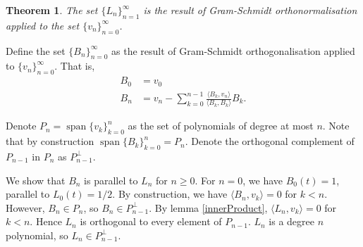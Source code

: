 \documentclass[10pt]{article}
\newtheorem{theorem}{Theorem}
\newenvironment{proof}[1][Proof]{\begin{trivlist}
\item[\hskip \labelsep {\bfseries #1}]}{\end{trivlist}}
\newcommand{\Span}{\operatorname{span}}
\begin{document}
        \begin{theorem}
            The set $\{L_n\}_{n=1}^\infty$ is the result of Gram-Schmidt orthonormalisation
            applied to the set $\{v_n\}_{n=0}^\infty$. 
        \end{theorem}
        \begin{proof}
            Define the set $\{B_n\}_{n=0}^\infty$ as the result of Gram-Schmidt orthogonalisation
            applied to $\{v_n\}_{n=0}^\infty$. That is,
            \begin{align*}
                B_0 &= v_0\\
                B_n &= v_n-\sum_{k=0}^{n-1} \frac{\langle B_k,v_n\rangle}{\langle B_k,B_k\rangle} B_k.
            \end{align*}
  
            Denote $P_n = \Span\{v_k\}_{k=0}^n$ as the set of
            polynomials of degree at most $n$. Note that by construction $\Span\{B_k\}_{k=0}^n = P_n$.
            Denote the orthogonal complement of $P_{n-1}$ in $P_{n}$ as $P_{n-1}^\perp$.
            
            We show that $B_n$ is parallel to $L_n$ for $n\geq 0$. For $n = 0$, we
            have $B_0(t) = 1$, parallel to $L_0(t) = 1/2$. By construction, we have $\langle B_n,v_k\rangle = 0$ for $k < n$.
            However, $B_n \in P_n$, so $B_n \in P_{n-1}^\perp$. 
            By lemma \ref{innerProduct}, $\langle L_n,v_k\rangle = 0$ for $k < n$.
            Hence $L_n$ is orthogonal to every element of $P_{n-1}$. $L_n$
            is a degree $n$ polynomial, so $L_n \in P_{n-1}^\perp$.
            
            

\end{proof}
\end{document}
